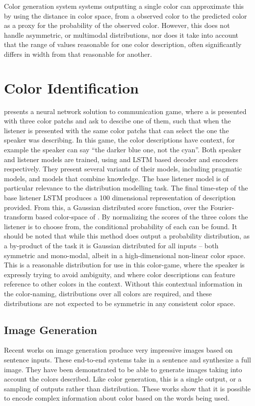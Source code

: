 \documentclass[11pt,letterpaper]{article}
\newcommand{\textcite}{\newcite}
\begin{document}
Color generation system systems outputting a single color can approximate this by using the distance in color space, from a observed color to the predicted color as a proxy for the probability of the observed color. However, this does not handle asymmetric, or multimodal distributions, nor does it take into account that the range of values reasonable for one color description, often significantly differs in width from that reasonable for another.

\section{Color Identification}

\textcite{DBLP:journals/corr/MonroeHGP17} presents a neural network solution to communication game, where a is presented with three color patchs and ask to descibe one of them, 
such that when the listener is presented with the same color patchs that can select the one the speaker was describing.
In this game, the color descriptions have context, for example the speaker can say ``the darker blue one, not the cyan''.
Both speaker and listener models are trained, using and LSTM based decoder and encoders respectively.
They present several variants of their models, including pragmatic models, and models that combine knowledge.
The base listener model is of particular relevance to the distribution modelling task.
The final time-step of the base listener LSTM produces a 100 dimensional representation of description provided.
From this, a Gaussian distributed score function, over the Fourier-transform based color-space of \textcite{2016arXiv160603821M}.
By normalizing the scores of the three colors the listener is to choose from, the conditional probability of each can be found.
It should be noted that while this method does output a probability distribution, as a by-product of the task
it is Gaussian distributed for all inputs -- both symmetric and mono-modal, albeit in a high-dimensional non-linear color space.
This is a reasonable distribution for use in this color-game, where the speaker is expressly trying to avoid ambiguity,
and where color descriptions can feature reference to other colors in the context.
Without this contextual information in the color-naming, distributions over all colors are required,
and these distributions are not expected to be symmetric in any consistent color space.

\subsection{Image Generation}
Recent works on image generation produce very impressive images based on sentence inputs\cite{reed2016generative,2015arXiv151102793M}.
These end-to-end systems take in a sentence and synthesize a full image.
They have been demonstrated to be able to generate images taking into account the colors described.
Like color generation, this is a single output, or a sampling of outputs rather than distribution.
These works show that it is possible to encode complex information about color based on the words being used.
\end{document}
